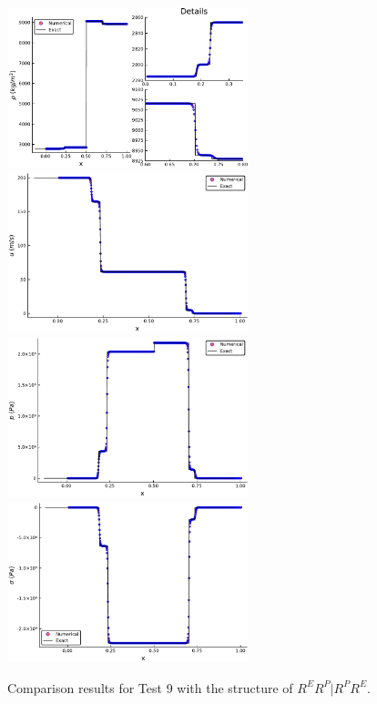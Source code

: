 \documentclass[review]{elsarticle}
\numberwithin{equation}{section}
\numberwithin{table}{section}
\begin{document}
\begin{figure}[ht]
  \centering
  \includegraphics[width= 7cm] {case6rho.pdf}
  \includegraphics[width= 7cm] {case6u.pdf}
  \includegraphics[width= 7cm] {case6p.pdf}
  \includegraphics[width= 7cm] {case6sigma.pdf}

    \caption{Comparison results for Test 9 with the structure of $R^ER^P|R^PR^E$.  }
  \label{fig:case7}
\end{figure}
\end{document}
